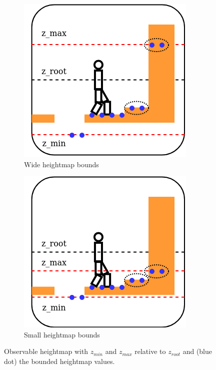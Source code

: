 \begin{figure}
    \captionsetup[subfigure]{justification=centering}
    \begin{subfigure}[t]{.49\linewidth}
    \includegraphics[width=\textwidth]{Figures/Chapter_LEAS/hm_bounded_high.png}
    \caption{Wide heightmap bounds}
    \end{subfigure}
    \begin{subfigure}[t]{.49\linewidth}
    \includegraphics[width=\textwidth]{Figures/Chapter_LEAS/hm_bounded_low.png}
    \caption{Small heightmap bounds}
    \end{subfigure}
    \caption{Observable heightmap with $z_{min}$ and  $z_{max}$ relative to $z_{root}$ and (blue dot) the bounded heightmap values.}
    \label{fig:heightmap_bounds}
\end{figure}

